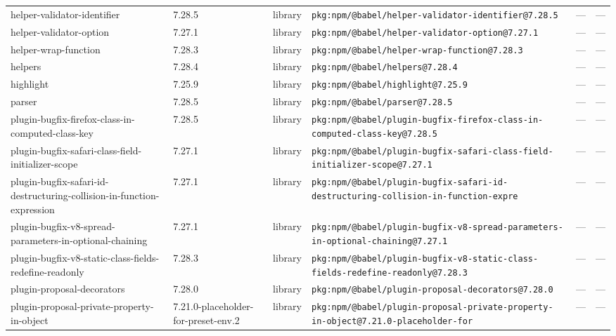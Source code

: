 \documentclass[11pt,a4paper]{article}
\begin{document}
\begin{longtable}{|p{4cm}|p{2cm}|p{1.6cm}|p{5cm}|p{1.5cm}|p{3.5cm}|}
\raggedright helper-validator-identifier & 7.28.5 & library & \small\texttt{pkg:npm/@babel/helper-validator-identifier@7.28.5} & — & \small — \\
\raggedright helper-validator-option & 7.27.1 & library & \small\texttt{pkg:npm/@babel/helper-validator-option@7.27.1} & — & \small — \\
\raggedright helper-wrap-function & 7.28.3 & library & \small\texttt{pkg:npm/@babel/helper-wrap-function@7.28.3} & — & \small — \\
\raggedright helpers & 7.28.4 & library & \small\texttt{pkg:npm/@babel/helpers@7.28.4} & — & \small — \\
\raggedright highlight & 7.25.9 & library & \small\texttt{pkg:npm/@babel/highlight@7.25.9} & — & \small — \\
\raggedright parser & 7.28.5 & library & \small\texttt{pkg:npm/@babel/parser@7.28.5} & — & \small — \\
\raggedright plugin-bugfix-firefox-class-in-computed-class-key & 7.28.5 & library & \small\texttt{pkg:npm/@babel/plugin-bugfix-firefox-class-in-computed-class-key@7.28.5} & — & \small — \\
\raggedright plugin-bugfix-safari-class-field-initializer-scope & 7.27.1 & library & \small\texttt{pkg:npm/@babel/plugin-bugfix-safari-class-field-initializer-scope@7.27.1} & — & \small — \\
\raggedright plugin-bugfix-safari-id-destructuring-collision-in-function-expression & 7.27.1 & library & \small\texttt{pkg:npm/@babel/plugin-bugfix-safari-id-destructuring-collision-in-function-expre} & — & \small — \\
\raggedright plugin-bugfix-v8-spread-parameters-in-optional-chaining & 7.27.1 & library & \small\texttt{pkg:npm/@babel/plugin-bugfix-v8-spread-parameters-in-optional-chaining@7.27.1} & — & \small — \\
\raggedright plugin-bugfix-v8-static-class-fields-redefine-readonly & 7.28.3 & library & \small\texttt{pkg:npm/@babel/plugin-bugfix-v8-static-class-fields-redefine-readonly@7.28.3} & — & \small — \\
\raggedright plugin-proposal-decorators & 7.28.0 & library & \small\texttt{pkg:npm/@babel/plugin-proposal-decorators@7.28.0} & — & \small — \\
\raggedright plugin-proposal-private-property-in-object & 7.21.0-placeholder-for-preset-env.2 & library & \small\texttt{pkg:npm/@babel/plugin-proposal-private-property-in-object@7.21.0-placeholder-for} & — & \small — \\

\end{longtable}
\end{document}
